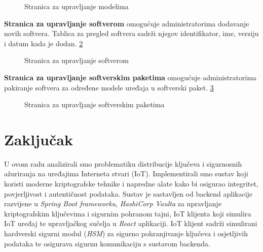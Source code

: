 \documentclass[zavrsnirad]{fer}
\begin{document}
	\begin{figure}[H]
		\centering
		\caption{Stranica za upravljanje modelima}
		\label{slk:model_page}
	\end{figure}
	
	\textbf{Stranica za upravljanje softverom} omogućuje administratorima dodavanje novih softvera. Tablica za pregled softvera sadrži njegov identifikator, ime, verziju i datum kada je dodan. \ref{slk:software_page}
	
	\begin{figure}[H]
		\centering
		\caption{Stranica za upravljanje softverom}
		\label{slk:software_page}
	\end{figure}
	
	\textbf{Stranica za upravljanje softverskim paketima} omogućuje administratorima pakiranje softvera za određene modele uređaja u softverski paket. \ref{slk:software_package_page}
	
	\begin{figure}[H]
		\centering
		\caption{Stranica za upravljanje softverskim paketima}
		\label{slk:software_package_page}
	\end{figure}
	
	
	
	\chapter{Zaključak}
	\label{pog:zakljucak}
	U ovom radu analizirali smo problematiku distribucije ključeva i sigurnosnih ažuriranja na uređajima Interneta stvari (IoT). Implementirali smo sustav koji koristi moderne kriptografske tehnike i napredne alate kako bi osigurao integritet, povjerljivost i autentičnost podataka. Sustav je sastavljen od backend aplikacije razvijene u \textit{Spring Boot frameworku}, \textit{HashiCorp Vaulta} za upravljanje kriptografskim ključevima i sigurnim pohranom tajni, IoT klijenta koji simulira IoT uređaj te upravljačkog sučelja u \textit{React} aplikaciji. IoT klijent sadrži simulirani hardverski sigurni modul (\textit{HSM}) za sigurno pohranjivanje ključeva i osjetljivih podataka te osigurava sigurnu komunikaciju s sustavom backenda.
	
\end{document}
